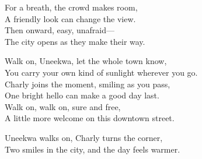 \begin{lyrics}
For a breath, the crowd makes room,\\
A friendly look can change the view.\\
Then onward, easy, unafraid—\\
The city opens as they make their way.

Walk on, Uneekwa, let the whole town know,\\
You carry your own kind of sunlight wherever you go.\\
Charly joins the moment, smiling as you pass,\\
One bright hello can make a good day last.\\
Walk on, walk on, sure and free,\\
A little more welcome on this downtown street.

Uneekwa walks on, Charly turns the corner,\\
Two smiles in the city, and the day feels warmer.
\end{lyrics}

